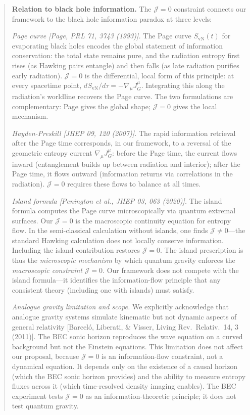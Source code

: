 \documentclass[11pt,a4paper]{article}
\begin{document}
\begin{quote}
\small
\textbf{Relation to black hole information.} The $\mathcal{J}=0$ constraint connects our framework to the black hole information paradox at three levels:

\textit{Page curve [Page, PRL 71, 3743 (1993)].} The Page curve $S_{\text{vN}}(t)$ for evaporating black holes encodes the global statement of information conservation: the total state remains pure, and the radiation entropy first rises (as Hawking pairs entangle) and then falls (as late radiation purifies early radiation). $\mathcal{J}=0$ is the differential, local form of this principle: at every spacetime point, $dS_{\text{vN}}/d\tau = -\nabla_\mu J^\mu_G$. Integrating this along the radiation's worldline recovers the Page curve. The two formulations are complementary: Page gives the global shape; $\mathcal{J}=0$ gives the local mechanism.

\textit{Hayden-Preskill [JHEP 09, 120 (2007)].} The rapid information retrieval after the Page time corresponds, in our framework, to a reversal of the geometric entropy current $\nabla_\mu J^\mu_G$: before the Page time, the current flows inward (entanglement builds up between radiation and interior); after the Page time, it flows outward (information returns via correlations in the radiation). $\mathcal{J}=0$ requires these flows to balance at all times.

\textit{Island formula [Penington et al., JHEP 03, 063 (2020)].} The island formula computes the Page curve microscopically via quantum extremal surfaces. Our $\mathcal{J}=0$ is the macroscopic continuity equation for entropy flow. In the semi-classical calculation without islands, one finds $\mathcal{J} \neq 0$---the standard Hawking calculation does not locally conserve information. Including the island contribution restores $\mathcal{J}=0$. The island prescription is thus the \emph{microscopic mechanism} by which quantum gravity enforces the \emph{macroscopic constraint} $\mathcal{J}=0$. Our framework does not compete with the island formula---it identifies the information-flow principle that any consistent theory (including one with islands) must satisfy.

\textit{Analogue gravity limitation and scope.} We explicitly acknowledge that analogue gravity systems simulate kinematic but not dynamic aspects of general relativity [Barcel\'o, Liberati, \& Visser, Living Rev.\ Relativ.\ 14, 3 (2011)]. The BEC sonic horizon reproduces the wave equation on a curved background but not the Einstein equations. This limitation does not affect our proposal, because $\mathcal{J}=0$ is an information-flow constraint, not a dynamical equation. It depends only on the existence of a causal horizon (which the BEC sonic horizon provides) and the ability to measure entropy fluxes across it (which time-resolved density imaging enables). The BEC experiment tests $\mathcal{J}=0$ as an information-theoretic principle; it does not test quantum gravity.
\end{quote}
\end{document}
